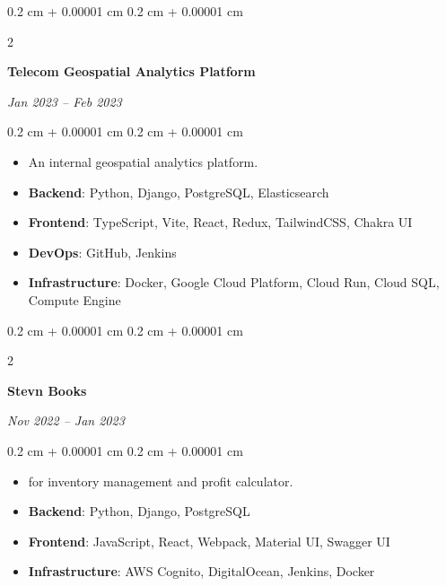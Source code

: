 \documentclass[10pt, a4paper]{article}
\newenvironment{highlights}{
    \begin{itemize}[
        topsep=0.10 cm,
        parsep=0.10 cm,
        partopsep=0pt,
        itemsep=0pt,
        leftmargin=0.4 cm + 10pt
    ]
}{
    \end{itemize}
} %
\newenvironment{onecolentry}{
    \begin{adjustwidth}{
        0.2 cm + 0.00001 cm
    }{
        0.2 cm + 0.00001 cm
    }
}{
    \end{adjustwidth}
} %
\newenvironment{twocolentry}[2][]{
    \onecolentry
    \def\secondColumn{#2}
    \setcolumnwidth{\fill, 4.5 cm}
    \begin{paracol}{2}
}{
    \switchcolumn \raggedleft \secondColumn
    \end{paracol}
    \endonecolentry
} %
\let\hrefWithoutArrow\href
\renewcommand{\href}[2]{\hrefWithoutArrow{#1}{\ifthenelse{\equal{#2}{}}{ }{#2 }\raisebox{.15ex}{\footnotesize \faExternalLink*}}}
\begin{document}
        \vspace{0.2 cm}

        \begin{twocolentry}{
            
            
        \textit{Jan 2023 – Feb 2023}}
            \textbf{Telecom Geospatial Analytics Platform}
        \end{twocolentry}

        \vspace{0.10 cm}
        \begin{onecolentry}
            \begin{highlights}
                \item An internal geospatial analytics platform.
                \item \textbf{Backend}: Python, Django, PostgreSQL, Elasticsearch
                \item \textbf{Frontend}: TypeScript, Vite, React, Redux, TailwindCSS, Chakra UI
                \item \textbf{DevOps}: GitHub, Jenkins
                \item \textbf{Infrastructure}: Docker, Google Cloud Platform, Cloud Run, Cloud SQL, Compute Engine
            \end{highlights}
        \end{onecolentry}


        \vspace{0.2 cm}

        \begin{twocolentry}{
            
            
        \textit{Nov 2022 – Jan 2023}}
            \textbf{Stevn Books}
        \end{twocolentry}

        \vspace{0.10 cm}
        \begin{onecolentry}
            \begin{highlights}
                \item \href{https://stevnbooks.com}{Web app} for inventory management and profit calculator.
                \item \textbf{Backend}: Python, Django, PostgreSQL
                \item \textbf{Frontend}: JavaScript, React, Webpack, Material UI, Swagger UI
                \item \textbf{Infrastructure}: AWS Cognito, DigitalOcean, Jenkins, Docker
            \end{highlights}
        \end{onecolentry}
\end{document}
